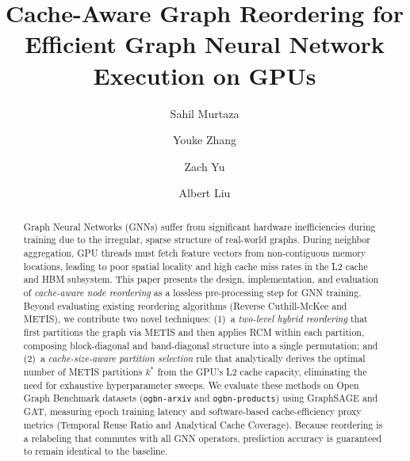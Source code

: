 \documentclass[sigconf,review]{acmart}
\begin{document}
\title{Cache-Aware Graph Reordering for Efficient Graph Neural Network Execution on GPUs}

\author{Sahil Murtaza}

\author{Youke Zhang}

\author{Zach Yu}

\author{Albert Liu}

\begin{abstract}
Graph Neural Networks (GNNs) suffer from significant hardware inefficiencies during training due to the irregular, sparse structure of real-world graphs. During neighbor aggregation, GPU threads must fetch feature vectors from non-contiguous memory locations, leading to poor spatial locality and high cache miss rates in the L2 cache and HBM subsystem. This paper presents the design, implementation, and evaluation of \emph{cache-aware node reordering} as a lossless pre-processing step for GNN training. Beyond evaluating existing reordering algorithms (Reverse Cuthill-McKee and METIS), we contribute two novel techniques: (1)~a \emph{two-level hybrid reordering} that first partitions the graph via METIS and then applies RCM within each partition, composing block-diagonal and band-diagonal structure into a single permutation; and (2)~a \emph{cache-size-aware partition selection} rule that analytically derives the optimal number of METIS partitions $k^*$ from the GPU's L2 cache capacity, eliminating the need for exhaustive hyperparameter sweeps. We evaluate these methods on Open Graph Benchmark datasets (\texttt{ogbn-arxiv} and \texttt{ogbn-products}) using GraphSAGE and GAT, measuring epoch training latency and software-based cache-efficiency proxy metrics (Temporal Reuse Ratio and Analytical Cache Coverage). Because reordering is a relabeling that commutes with all GNN operators, prediction accuracy is guaranteed to remain identical to the baseline.
\end{abstract}

\end{document}
